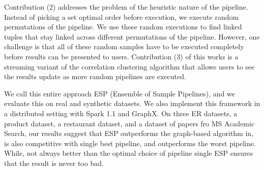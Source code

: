 Contribution (2) addresses the problem of the heuristic nature of the pipeline.
Instead of picking a set optimal order before execution, we execute random permutations of the pipeline.
We use these random executions to find linked tuples that stay linked across different permutations of the pipeline.
However, one challenge is that all of these random samples have to be executed completely before results can be presented to users.
Contribution (3) of this works is a streaming variant of the correlation clustering algorithm that allows users to see the results update as more random pipelines are executed.

We call this entire approach ESP (Ensemble of Sample Pipelines), and we evaluate this on real and synthetic datasets.
We also implement this framework in a distributed setting with Spark 1.1 and GraphX.
On three ER datasets, a product dataset, a restaurant dataset, and a dataset of papers fro MS Academic Search, 
our results suggest that ESP outperforms the graph-based algorithm in\cite{wang2012crowder}, is also competitive with single best pipeline, and outperforms the worst pipeline.
While, not always better than the optimal choice of pipeline single ESP ensures that the result is never too bad.









